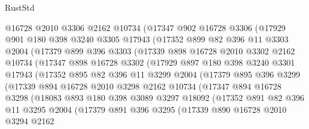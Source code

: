 \begin{lexlean}{RustStd}
\begin{coremodule}
        @16728
        @2010
        @3306
        @2162
        @10734
        (@17347
          @902
          @16728
          @3306
          (@17929
            @901
            @180
            @398
            @3240
            @3305
            @17943
            (@17352
              @899
              @82
              @396
              @11
              @3303
              @2004
              (@17379
                @899
                @396
                @3303
                (@17339
                  @898
                  @16728
                  @2010
                  @3302
                  @2162
                  @10734
                  (@17347
                    @898
                    @16728
                    @3302
                    (@17929
                      @897
                      @180
                      @398
                      @3240
                      @3301
                      @17943
                      (@17352
                        @895
                        @82
                        @396
                        @11
                        @3299
                        @2004
                        (@17379
                          @895
                          @396
                          @3299
                          (@17339
                            @894
                            @16728
                            @2010
                            @3298
                            @2162
                            @10734
                            (@17347
                              @894
                              @16728
                              @3298
                              (@18083
                                @893
                                @180
                                @398
                                @3089
                                @3297
                                @18092
                                (@17352
                                  @891
                                  @82
                                  @396
                                  @11
                                  @3295
                                  @2004
                                  (@17379
                                    @891
                                    @396
                                    @3295
                                    (@17339
                                      @890
                                      @16728
                                      @2010
                                      @3294
                                      @2162

\end{coremodule}
\end{lexlean}
